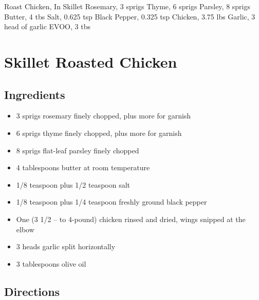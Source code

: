 Roast Chicken, In Skillet
  Rosemary, 3 sprigs
  Thyme, 6 sprigs
  Parsley, 8 sprigs
  Butter, 4 tbs
  Salt, 0.625 tsp
  Black Pepper, 0.325 tsp
  Chicken, 3.75 lbs
  Garlic, 3 head of garlic
  EVOO, 3 tbs

\section{ Skillet Roasted Chicken }

\subsection{ Ingredients }

\begin{itemize}
  \item 3 sprigs rosemary finely chopped, plus more for garnish
  \item 6 sprigs thyme finely chopped, plus more for garnish
  \item 8 sprigs flat-leaf parsley finely chopped
  \item 4 tablespoons butter at room temperature
  \item 1/8 teaspoon plus 1/2 teaspoon salt
  \item 1/8 teaspoon plus 1/4 teaspoon freshly ground black pepper
  \item One (3 1/2 – to 4-pound) chicken rinsed and dried, wings snipped at the elbow
  \item 3 heads garlic split horizontally
  \item 3 tablespoons olive oil
\end{itemize}

\subsection{ Directions }


